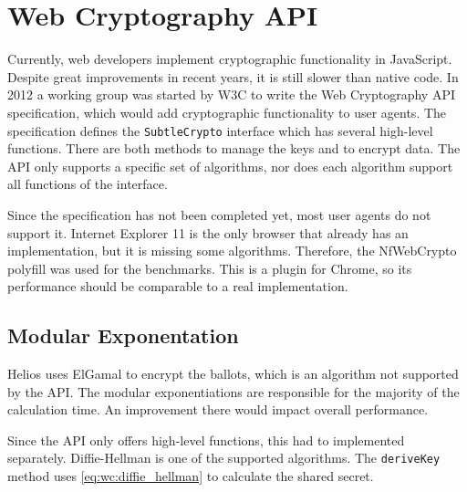 % 
%

\section{Web Cryptography API}

Currently, web developers implement cryptographic functionality in JavaScript. Despite great improvements in recent years, it is still slower than native code.\cite{site:resig_javascript_performance_rundown}\cite{site:cois_javascript_performance_rundown_2012}\cite{smedberg_performance_analysis_of_javascript} In 2012 a working group was started by W3C to write the Web Cryptography API specification, which would add cryptographic functionality to user agents.\cite{wiki:webcrypto} The specification defines the \texttt{SubtleCrypto} interface which has several high-level functions.\cite{sleevi_watson_web_cryptography_api} There are both methods to manage the keys and to encrypt data. The API only supports a specific set of algorithms, nor does each algorithm support all functions of the interface.

\par Since the specification has not been completed yet, most user agents do not support it. Internet Explorer 11 is the only browser that already has an implementation, but it is missing some algorithms.\cite{site:microsoft_web_cryptography} Therefore, the NfWebCrypto polyfill was used for the benchmarks. This is a \cplusplus plugin for Chrome, so its performance should be comparable to a real implementation.

\subsection{Modular Exponentation}
\label{sec:wc:modular_exponentiation}

Helios uses ElGamal to encrypt the ballots, which is an algorithm not supported by the API. The modular exponentiations are responsible for the majority of the calculation time. An improvement there would impact overall performance.

\par Since the API only offers high-level functions, this had to implemented separately. Diffie-Hellman is one of the supported algorithms. The \texttt{deriveKey} method uses \ref{eq:wc:diffie_hellman} to calculate the shared secret.\cite{diffie_hellman_new_directions_in_cryptography}

